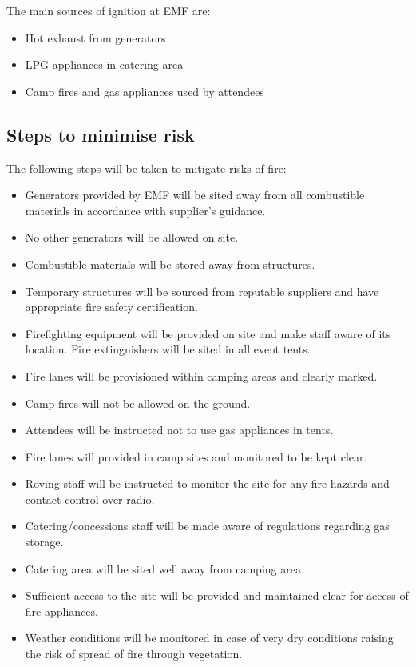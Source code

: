 The main sources of ignition at EMF are:

\begin{itemize}
\item Hot exhaust from generators
\item LPG appliances in catering area
\item Camp fires and gas appliances used by attendees
\end{itemize}

\subsection{Steps to minimise risk}
The following steps will be taken to mitigate risks of fire:

\begin{itemize}
\item Generators provided by EMF will be sited away from all combustible materials in accordance with supplier's guidance.
\item No other generators will be allowed on site.
\item Combustible materials will be stored away from structures.
\item Temporary structures will be sourced from reputable suppliers and have appropriate fire safety certification.
\item Firefighting equipment will be provided on site and make staff aware of its location. Fire extinguishers will be sited in all event tents.
\item Fire lanes will be provisioned within camping areas and clearly marked.
\item Camp fires will not be allowed on the ground.
\item Attendees will be instructed not to use gas appliances in tents.
\item Fire lanes will provided in camp sites and monitored to be kept clear.
\item Roving staff will be instructed to monitor the site for any fire hazards and contact control over radio.
\item Catering/concessions staff will be made aware of regulations regarding gas storage.
\item Catering area will be sited well away from camping area.
\item Sufficient access to the site will be provided and maintained clear for access of fire appliances.
\item Weather conditions will be monitored in case of very dry conditions raising the risk of spread of fire through vegetation.
\end{itemize}

